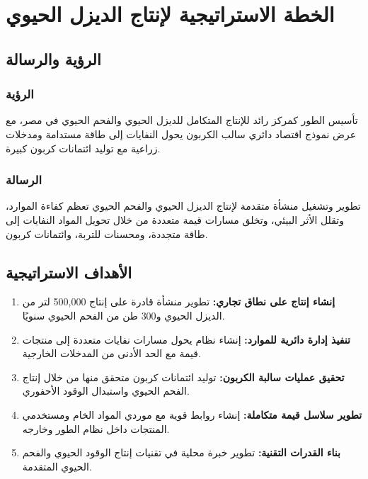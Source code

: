 \section{الخطة الاستراتيجية لإنتاج الديزل الحيوي}

\subsection{الرؤية والرسالة}

\subsubsection{الرؤية}
تأسيس الطور كمركز رائد للإنتاج المتكامل للديزل الحيوي والفحم الحيوي في مصر، مع عرض نموذج اقتصاد دائري سالب الكربون يحول النفايات إلى طاقة مستدامة ومدخلات زراعية مع توليد ائتمانات كربون كبيرة.

\subsubsection{الرسالة}
تطوير وتشغيل منشأة متقدمة لإنتاج الديزل الحيوي والفحم الحيوي تعظم كفاءة الموارد، وتقلل الأثر البيئي، وتخلق مسارات قيمة متعددة من خلال تحويل المواد النفايات إلى طاقة متجددة، ومحسنات للتربة، وائتمانات كربون.

\subsection{الأهداف الاستراتيجية}

\begin{enumerate}
    \item \textbf{إنشاء إنتاج على نطاق تجاري:} تطوير منشأة قادرة على إنتاج 500,000 لتر من الديزل الحيوي و300 طن من الفحم الحيوي سنويًا.
    
    \item \textbf{تنفيذ إدارة دائرية للموارد:} إنشاء نظام يحول مسارات نفايات متعددة إلى منتجات قيمة مع الحد الأدنى من المدخلات الخارجية.
    
    \item \textbf{تحقيق عمليات سالبة الكربون:} توليد ائتمانات كربون متحقق منها من خلال إنتاج الفحم الحيوي واستبدال الوقود الأحفوري.
    
    \item \textbf{تطوير سلاسل قيمة متكاملة:} إنشاء روابط قوية مع موردي المواد الخام ومستخدمي المنتجات داخل نظام الطور وخارجه.
    
    \item \textbf{بناء القدرات التقنية:} تطوير خبرة محلية في تقنيات إنتاج الوقود الحيوي والفحم الحيوي المتقدمة.
\end{enumerate}

